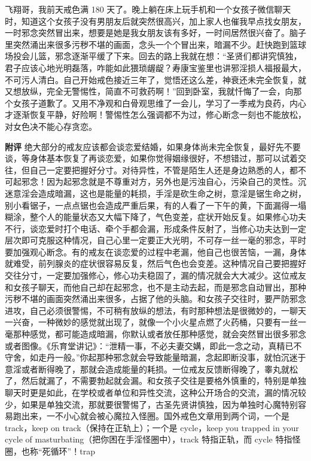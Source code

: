 \begin{case}
    飞翔哥，我前天戒色满 180 天了。晚上躺在床上玩手机和一个女孩子微信聊天时，知道这个女孩子没有男朋友后就突然很高兴，加上家人也催我早点找女朋友，一时邪念突然冒出来，想要是她是我女朋友该有多好，一时间居然很兴奋了。脑子里突然涌出来很多污秽不堪的画面，念头一个个冒出来，暗漏不少。赶快跑到篮球场投会儿篮，邪念逐渐平缓了下来。回去的路上我就在想：“圣贤们都讲究慎独，君子应该心地光明磊落，咋能如此猥琐龌龊？寿康宝鉴里也讲邪淫损人福报最大，不可污人清白。自己开始戒色接近三年了，觉悟还这么差，神衰还未完全恢复，就又想放纵，完全无警惕性，简直不可救药啊！”回到卧室，我就忏悔了一会，向那个女孩子道歉了。又用不净观和白骨观思维了一会儿，学习了一季戒为良药，内心才逐渐恢复平静，好险啊！警惕性怎么强调都不为过，修心断念一刻也不能放松，对女色决不能心存贪恋。

    \textbf{附评} 绝大部分的戒友应该都会谈恋爱结婚，如果身体尚未完全恢复，最好先不要谈，等身体基本恢复了再谈恋爱，如果你觉得姻缘很好，不想错过，那可以试着交往，但自己一定要把握好分寸。对待异性，不管是陌生人还是身边熟悉的人，都不可起邪念！因为起邪念就是不尊重对方，另外也是污浊自心，污染自己的灵性。沉迷意淫会造成暗漏，这也是能量的耗损，手淫是砍生命之树，意淫是锯生命之树，别小看锯子，一点点锯也会造成严重后果，有的人看了一下午的黄，下面漏得一塌糊涂，整个人的能量状态又大幅下降了，气色变差，症状开始反复。如果修心功夫不行，谈恋爱时打个电话、牵个手都会漏，形成条件反射了，当修心功夫达到一定层次即可克服这种情况，自己心里一定要正大光明，不可存一丝一毫的邪念，平时要加强观心断念。有的戒友在谈恋爱的过程中老漏，他自己也很苦恼，一漏，身体就难受，前列腺炎的症状很容易反复，然后气色也会变差。这种情况自己要把握好交往分寸，一定要加强修心，修心功夫稳固了，漏的情况就会大大减少。这位戒友和女孩子聊天，而他自己却在起邪念，也不是主动去起，而是邪念自动冒出，那种污秽不堪的画面突然涌出来很多，占据了他的头脑。和女孩子交往时，要严防邪念进攻，自己必须很警惕，不可稍有放纵的想法，有时那种想法是很微妙的，一聊天一兴奋，一种微妙的感觉就出现了，就像一个小火星点燃了火药桶，只要有一丝一毫那种感觉，都可能造成暗漏，你默认或者放任那种感觉，就会突然冒出很多邪念或者图像。《乐育堂讲记》：“泄精一事，不必夫妻交媾，即此一念之动，真精已不守舍，如走丹一般。”你起那种邪念就会导致能量暗漏，念起即断没事，就怕沉迷于意淫或者断得晚了，那就会造成能量的耗损。一位戒友反馈断得晚了，睾丸就松了，然后就漏了，不需要勃起就会漏。和女孩子交往是要格外慎重的，特别是单独聊天时更是如此，在学校或者单位和异性交流，这种公开场合的交流，漏的情况较少，如果是单独交流，那就要很警惕了，古圣先贤讲慎独，因为单独时心魔特别容易跑出来，一不小心就会被心魔拉入怪圈。国外戒色文章用到两个词，一个是 track，keep on track（保持在正轨上）；一个是 cycle，keep you trapped in your cycle of masturbating（把你困在手淫怪圈中），track 特指正轨，而 cycle 特指怪圈，也称“死循环”！trap 
\end{case}
